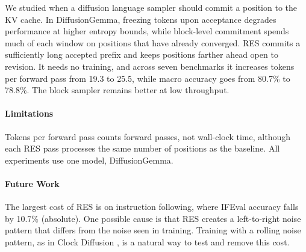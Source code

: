 We studied when a diffusion language sampler should commit a position to the KV cache.
In DiffusionGemma, freezing tokens upon acceptance degrades performance at higher entropy bounds, while block-level commitment spends much of each window on positions that have already converged.
RES commits a sufficiently long accepted prefix and keeps positions farther ahead open to revision.
It needs no training, and across seven benchmarks it increases tokens per forward pass from 19.3 to 25.5, while macro accuracy goes from 80.7\% to 78.8\%.
The block sampler remains better at low throughput.

\paragraph{Limitations}
Tokens per forward pass counts forward passes, not wall-clock time, although each RES pass processes the same number of positions as the baseline.
All experiments use one model, DiffusionGemma.

\paragraph{Future Work}
The largest cost of RES is on instruction following, where IFEval accuracy falls by 10.7\% (absolute).
One possible cause is that RES creates a left-to-right noise pattern that differs from the noise seen in training.
Training with a rolling noise pattern, as in Clock Diffusion \citep{schiff2026clock}, is a natural way to test and remove this cost.
